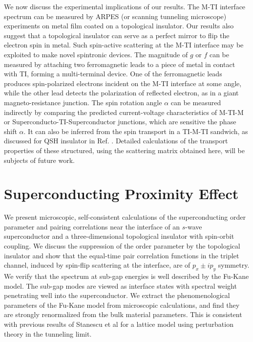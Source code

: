 \documentclass[11pt,revtex,aps]{report}
\begin{document}
We now discuss the experimental implications of our results. The M-TI interface spectrum can be measured by 
ARPES (or scanning tunneling microscope) experiments on metal film coated on a topological insulator.
Our results also suggest that a topological insulator can serve as a perfect mirror to flip the 
electron spin in metal. Such spin-active scattering at the M-TI interface may be 
exploited to make novel spintronic devices. The magnitude of $g$ or $f$
can be measured by attaching two ferromagnetic leads to a piece of metal in contact with TI, 
forming a multi-terminal device. 
One of the ferromagnetic leads produces spin-polarized electrons incident on the M-TI interface at some angle, while 
the other lead detects the polarization of reflected electron, as in a
giant magneto-resistance junction. The spin rotation angle $\alpha$ can be measured 
indirectly by comparing the predicted current-voltage characteristics of M-TI-M 
or Superconducto-TI-Superconductor junctions, which are sensitive the phase shift $\alpha$. It can also be inferred from 
the spin transport in a TI-M-TI sandwich, as discussed for QSH insulator in Ref. \cite{yokoyama09}.
Detailed calculations of the transport properties of these structured,
using the scattering matrix obtained here, will be subjects of future work.

\chapter{Superconducting Proximity Effect}

We present microscopic, self-consistent calculations of the 
superconducting order parameter and pairing correlations near the 
interface of an $s$-wave superconductor and
a three-dimensional topological insulator with spin-orbit coupling.
%
We discuss the suppression of the order parameter by the topological 
insulator and show that the equal-time pair correlation functions
in the triplet channel, induced by spin-flip scattering at the interface, 
are of $p_x\pm i p_y$ symmetry.
%
We verify that the spectrum at sub-gap energies is well described by
the Fu-Kane model. The sub-gap modes are viewed as interface states with
spectral weight penetrating well into the superconductor. 
We extract the phenomenological 
parameters of the Fu-Kane model from microscopic calculations, and find they
are strongly renormalized from the bulk material parameters. This is consistent 
with previous results of Stanescu et al for a lattice model using perturbation
theory in the tunneling limit.
\end{document}
